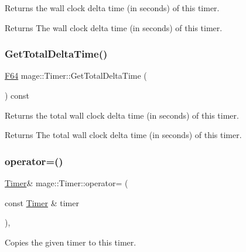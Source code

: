 Returns the wall clock delta time (in seconds) of this timer.

\begin{DoxyReturn}{Returns}
The wall clock delta time (in seconds) of this timer. 
\end{DoxyReturn}
\hypertarget{classmage_1_1_timer_a21ee76bc048a3c80f1bfbbbd807e97a7}{}\label{classmage_1_1_timer_a21ee76bc048a3c80f1bfbbbd807e97a7} 
\subsubsection{\texorpdfstring{Get\+Total\+Delta\+Time()}{GetTotalDeltaTime()}}
{\footnotesize\ttfamily \hyperlink{namespacemage_ad26233bbec640deda836e572c1a23708}{F64} mage\+::\+Timer\+::\+Get\+Total\+Delta\+Time (\begin{DoxyParamCaption}{ }\end{DoxyParamCaption}) const\hspace{0.3cm}{\ttfamily [noexcept]}}

Returns the total wall clock delta time (in seconds) of this timer.

\begin{DoxyReturn}{Returns}
The total wall clock delta time (in seconds) of this timer. 
\end{DoxyReturn}
\hypertarget{classmage_1_1_timer_a607d4bce80a92977bc8394c8774a6434}{}\label{classmage_1_1_timer_a607d4bce80a92977bc8394c8774a6434} 
\subsubsection{\texorpdfstring{operator=()}{operator=()}\hspace{0.1cm}{\footnotesize\ttfamily [1/2]}}
{\footnotesize\ttfamily \hyperlink{classmage_1_1_timer}{Timer}\& mage\+::\+Timer\+::operator= (\begin{DoxyParamCaption}\item[{const \hyperlink{classmage_1_1_timer}{Timer} \&}]{timer }\end{DoxyParamCaption})\hspace{0.3cm}{\ttfamily [default]}, {\ttfamily [noexcept]}}

Copies the given timer to this timer.


